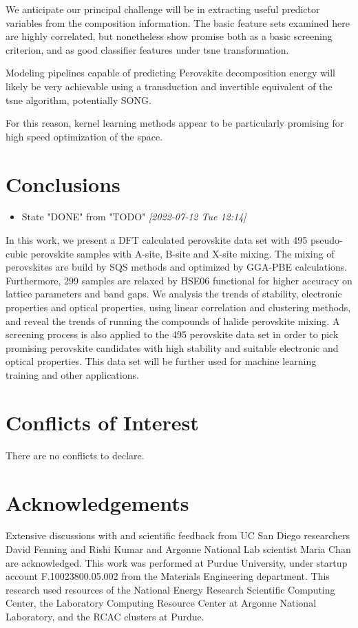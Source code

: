 \documentclass[twoside, twocolumn, 9pt, draft]{article}
\begin{document}
We anticipate our principal challenge will be in extracting useful
predictor variables from the composition information. The basic
feature sets examined here are highly correlated, but nonetheless show
promise both as a basic screening criterion, and as good classifier
features under \gls{tsne} transformation.

Modeling pipelines capable of predicting Perovskite decomposition
energy will likely be very achievable using a transduction and
invertible equivalent of the \gls{tsne} algorithm,
potentially SONG.

For this reason, kernel learning methods appear to be particularly
promising for high speed optimization of the space.

\section*{Conclusions}
\label{sec:org0b6e640}
\begin{itemize}
\item State "DONE"       from "TODO"       \textit{[2022-07-12 Tue 12:14]}
\end{itemize}
In this work, we present a DFT calculated perovskite data set with 495
pseudo-cubic perovskite samples with A-site, B-site and X-site
mixing. The mixing of perovskites are build by SQS methods and
optimized by GGA-PBE calculations. Furthermore, 299 samples are
relaxed by HSE06 functional for higher accuracy on lattice parameters
and band gaps. We analysis the trends of stability, electronic
properties and optical properties, using linear correlation and
clustering methods, and reveal the trends of running the compounds of
halide perovskite mixing. A screening process is also applied to the
495 perovskite data set in order to pick promising perovskite
candidates with high stability and suitable electronic and optical
properties. This data set will be further used for machine learning
training and other applications.

\section*{Conflicts of Interest}
\label{sec:orga9949ec}
There are no conflicts to declare.

\section*{Acknowledgements}
\label{sec:org89dfb57}
Extensive discussions with and scientific feedback from UC San Diego
researchers David Fenning and Rishi Kumar and Argonne National Lab
scientist Maria Chan are acknowledged. This work was performed at
Purdue University, under startup account F.10023800.05.002 from the
Materials Engineering department. This research used resources of the
National Energy Research Scientific Computing Center, the Laboratory
Computing Resource Center at Argonne National Laboratory, and the RCAC
clusters at Purdue.
\end{document}
